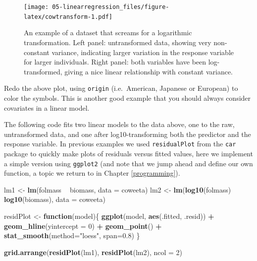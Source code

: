 \documentclass[]{book}
\newenvironment{Shaded}{\begin{snugshade}}{\end{snugshade}}
\newcommand{\ControlFlowTok}[1]{\textcolor[rgb]{0.13,0.29,0.53}{\textbf{#1}}}
\newcommand{\DataTypeTok}[1]{\textcolor[rgb]{0.13,0.29,0.53}{#1}}
\newcommand{\DecValTok}[1]{\textcolor[rgb]{0.00,0.00,0.81}{#1}}
\newcommand{\FloatTok}[1]{\textcolor[rgb]{0.00,0.00,0.81}{#1}}
\newcommand{\KeywordTok}[1]{\textcolor[rgb]{0.13,0.29,0.53}{\textbf{#1}}}
\newcommand{\NormalTok}[1]{#1}
\newcommand{\OperatorTok}[1]{\textcolor[rgb]{0.81,0.36,0.00}{\textbf{#1}}}
\newcommand{\StringTok}[1]{\textcolor[rgb]{0.31,0.60,0.02}{#1}}
\let\BeginKnitrBlock\begin \let\EndKnitrBlock\end
\begin{document}
\begin{figure}
\centering
\texttt{[image: 05-linearregression\_files/figure-latex/cowtransform-1.pdf]}
\caption{\label{fig:cowtransform}An example of a dataset that screams for a logarithmic transformation. Left panel: untransformed data, showing very non-constant variance, indicating larger variation in the response variable for larger individuals. Right panel: both variables have been log-transformed, giving a nice linear relationship with constant variance.}
\end{figure}

\BeginKnitrBlock{rmdtry}
Redo the above plot, using \texttt{origin} (i.e.~American, Japanese or European) to color the symbols. This is another good example that you should always consider covariates in a linear model.
\EndKnitrBlock{rmdtry}

The following code fits two linear models to the data above, one to the raw, untransformed data, and one after log10-transforming both the predictor and the response variable. In previous examples we used \texttt{residualPlot} from the \texttt{car} package to quickly make plots of residuals versus fitted values, here we implement a simple version using \texttt{ggplot2} (and note that we jump ahead and define our own function, a topic we return to in Chapter \ref{programming}).

\begin{Shaded}
\begin{Highlighting}[]
\NormalTok{lm1 <-}\StringTok{ }\KeywordTok{lm}\NormalTok{(folmass }\OperatorTok{~}\StringTok{ }\NormalTok{biomass, }\DataTypeTok{data =}\NormalTok{ coweeta)}
\NormalTok{lm2 <-}\StringTok{ }\KeywordTok{lm}\NormalTok{(}\KeywordTok{log10}\NormalTok{(folmass) }\OperatorTok{~}\StringTok{ }\KeywordTok{log10}\NormalTok{(biomass), }\DataTypeTok{data =}\NormalTok{ coweeta)}

\NormalTok{residPlot <-}\StringTok{ }\ControlFlowTok{function}\NormalTok{(model)\{}
  \KeywordTok{ggplot}\NormalTok{(model, }\KeywordTok{aes}\NormalTok{(.fitted, .resid)) }\OperatorTok{+}\StringTok{ }
\StringTok{    }\KeywordTok{geom_hline}\NormalTok{(}\DataTypeTok{yintercept =} \DecValTok{0}\NormalTok{) }\OperatorTok{+}\StringTok{ }
\StringTok{    }\KeywordTok{geom_point}\NormalTok{() }\OperatorTok{+}
\StringTok{    }\KeywordTok{stat_smooth}\NormalTok{(}\DataTypeTok{method=}\StringTok{"loess"}\NormalTok{, }\DataTypeTok{span=}\FloatTok{0.8}\NormalTok{)}
\NormalTok{\}}

\KeywordTok{grid.arrange}\NormalTok{(}\KeywordTok{residPlot}\NormalTok{(lm1), }\KeywordTok{residPlot}\NormalTok{(lm2), }\DataTypeTok{ncol =} \DecValTok{2}\NormalTok{)}
\end{Highlighting}
\end{Shaded}
\end{document}

